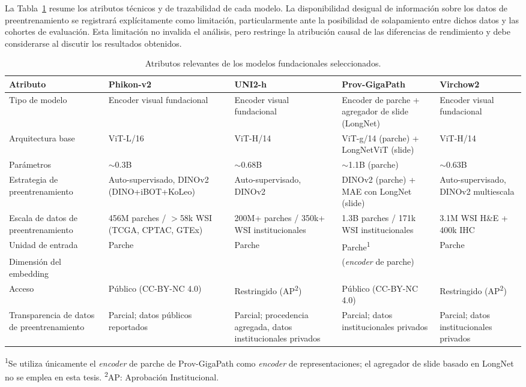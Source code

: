 La Tabla~\ref{tab:atributos_modelos} resume los atributos técnicos y de trazabilidad de cada modelo. La disponibilidad desigual de información sobre los datos de preentrenamiento se registrará explícitamente como limitación, particularmente ante la posibilidad de solapamiento entre dichos datos y las cohortes de evaluación. Esta limitación no invalida el análisis, pero restringe la atribución causal de las diferencias de rendimiento y debe considerarse al discutir los resultados obtenidos.

\begin{table}[htbp]
\centering
\caption{Atributos relevantes de los modelos fundacionales seleccionados.}
\label{tab:atributos_modelos}
\small
\begin{tabularx}{\textwidth}{>{\raggedright\arraybackslash}p{2.2cm} >{\raggedright\arraybackslash}X >{\raggedright\arraybackslash}X >{\raggedright\arraybackslash}X >{\raggedright\arraybackslash}X}
\toprule
\textbf{Atributo} & \textbf{Phikon-v2} & \textbf{UNI2-h} & \textbf{Prov-GigaPath} & \textbf{Virchow2} \\
\midrule
Tipo de modelo & Encoder visual fundacional & Encoder visual fundacional & Encoder de parche + agregador de slide (LongNet) & Encoder visual fundacional \\
Arquitectura base & ViT-L/16 & ViT-H/14 & ViT-g/14 (parche) + LongNetViT (slide) & ViT-H/14 \\
Parámetros & $\sim$0.3B & $\sim$0.68B & $\sim$1.1B (parche) & $\sim$0.63B \\
Estrategia de preentrenamiento & Auto-supervisado, DINOv2 (DINO+iBOT+KoLeo) & Auto-supervisado, DINOv2 & DINOv2 (parche) + MAE con LongNet (slide) & Auto-supervisado, DINOv2 multiescala \\
Escala de datos de preentrenamiento & 456M parches / $>$58k WSI (TCGA, CPTAC, GTEx) & 200M+ parches / 350k+ WSI institucionales & 1.3B parches / 171k WSI institucionales & 3.1M WSI H\&E + 400k IHC \\
Unidad de entrada & Parche & Parche & Parche\textsuperscript{1} & Parche \\
Dimensión del embedding & 1024 & 1536 & 1536 (\textit{encoder} de parche) & 2560 \\
Acceso & Público (CC-BY-NC 4.0) & Restringido (AP\textsuperscript{2}) & Público (CC-BY-NC 4.0) & Restringido (AP\textsuperscript{2})\\
Transparencia de datos de preentrenamiento & Parcial; datos públicos reportados & Parcial; procedencia agregada, datos institucionales privados & Parcial; datos institucionales privados & Parcial; datos institucionales privados \\
\bottomrule
\end{tabularx}
\begin{flushleft}
\footnotesize{\textsuperscript{1}Se utiliza únicamente el \textit{encoder} de parche de Prov-GigaPath como \textit{encoder} de representaciones; el agregador de slide basado en LongNet no se emplea en esta tesis.}
\footnotesize{\textsuperscript{2}AP: Aprobación Institucional.}
\end{flushleft}
\end{table}

